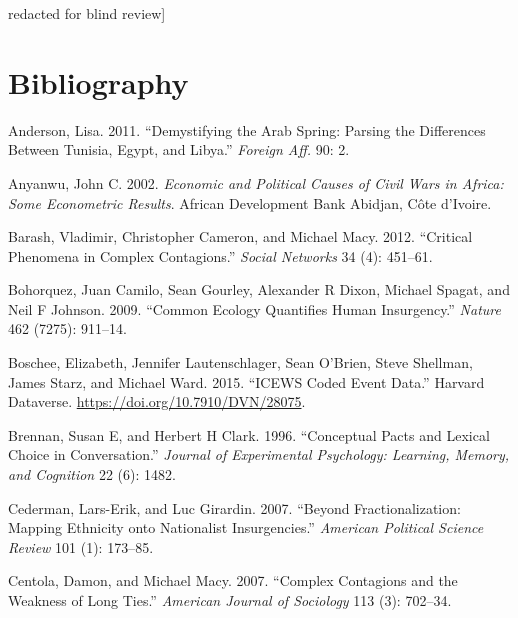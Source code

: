 \documentclass[english,man]{apa6}
\begin{document}
\noindent{[}redacted for blind review{]}

\newpage

\hypertarget{bibliography}{%
\section{Bibliography}\label{bibliography}}

\begingroup
\setlength{\parindent}{-0.5in}
\setlength{\leftskip}{0.5in}

\hypertarget{refs}{}
\leavevmode\hypertarget{ref-anderson2011demystifying}{}%
Anderson, Lisa. 2011. ``Demystifying the Arab Spring: Parsing the Differences Between Tunisia, Egypt, and Libya.'' \emph{Foreign Aff.} 90: 2.

\leavevmode\hypertarget{ref-anyanwu2002economic}{}%
Anyanwu, John C. 2002. \emph{Economic and Political Causes of Civil Wars in Africa: Some Econometric Results}. African Development Bank Abidjan, Côte d'Ivoire.

\leavevmode\hypertarget{ref-barash2012critical}{}%
Barash, Vladimir, Christopher Cameron, and Michael Macy. 2012. ``Critical Phenomena in Complex Contagions.'' \emph{Social Networks} 34 (4): 451--61.

\leavevmode\hypertarget{ref-bohorquez2009common}{}%
Bohorquez, Juan Camilo, Sean Gourley, Alexander R Dixon, Michael Spagat, and Neil F Johnson. 2009. ``Common Ecology Quantifies Human Insurgency.'' \emph{Nature} 462 (7275): 911--14.

\leavevmode\hypertarget{ref-DVNux2f28075_2015}{}%
Boschee, Elizabeth, Jennifer Lautenschlager, Sean O'Brien, Steve Shellman, James Starz, and Michael Ward. 2015. ``ICEWS Coded Event Data.'' Harvard Dataverse. \url{https://doi.org/10.7910/DVN/28075}.

\leavevmode\hypertarget{ref-brennan1996conceptual}{}%
Brennan, Susan E, and Herbert H Clark. 1996. ``Conceptual Pacts and Lexical Choice in Conversation.'' \emph{Journal of Experimental Psychology: Learning, Memory, and Cognition} 22 (6): 1482.

\leavevmode\hypertarget{ref-cederman2007beyond}{}%
Cederman, Lars-Erik, and Luc Girardin. 2007. ``Beyond Fractionalization: Mapping Ethnicity onto Nationalist Insurgencies.'' \emph{American Political Science Review} 101 (1): 173--85.

\leavevmode\hypertarget{ref-centola2007complex}{}%
Centola, Damon, and Michael Macy. 2007. ``Complex Contagions and the Weakness of Long Ties.'' \emph{American Journal of Sociology} 113 (3): 702--34.
\end{document}

